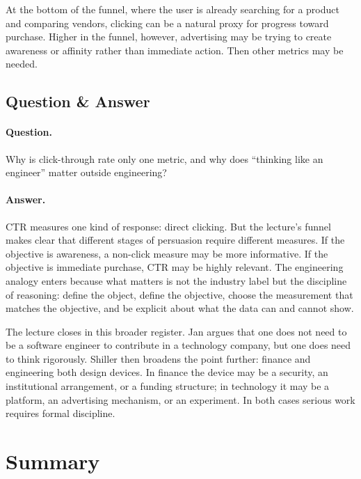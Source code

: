 At the bottom of the funnel, where the user is already searching for a product and comparing vendors, clicking can be a natural proxy for progress toward purchase. Higher in the funnel, however, advertising may be trying to create awareness or affinity rather than immediate action. Then other metrics may be needed.

\subsection{Question \& Answer}

\paragraph{Question.} Why is click-through rate only one metric, and why does ``thinking like an engineer'' matter outside engineering?

\paragraph{Answer.} CTR measures one kind of response: direct clicking. But the lecture's funnel makes clear that different stages of persuasion require different measures. If the objective is awareness, a non-click measure may be more informative. If the objective is immediate purchase, CTR may be highly relevant. The engineering analogy enters because what matters is not the industry label but the discipline of reasoning: define the object, define the objective, choose the measurement that matches the objective, and be explicit about what the data can and cannot show.

The lecture closes in this broader register. Jan argues that one does not need to be a software engineer to contribute in a technology company, but one does need to think rigorously. Shiller then broadens the point further: finance and engineering both design devices. In finance the device may be a security, an institutional arrangement, or a funding structure; in technology it may be a platform, an advertising mechanism, or an experiment. In both cases serious work requires formal discipline.

\section{Summary}

